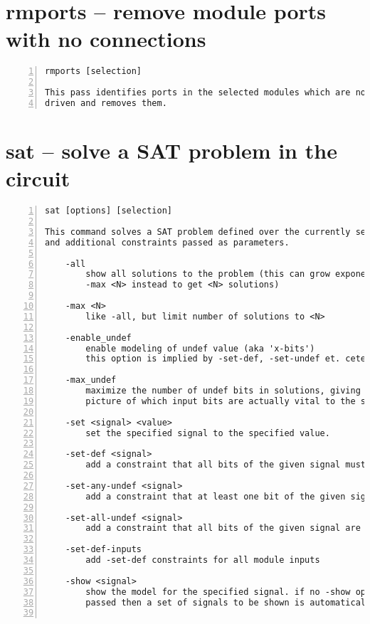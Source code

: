\section{rmports -- remove module ports with no connections}
\label{cmd:rmports}
\begin{lstlisting}[numbers=left,frame=single]
    rmports [selection]

This pass identifies ports in the selected modules which are not used or
driven and removes them.
\end{lstlisting}

\section{sat -- solve a SAT problem in the circuit}
\label{cmd:sat}
\begin{lstlisting}[numbers=left,frame=single]
    sat [options] [selection]

This command solves a SAT problem defined over the currently selected circuit
and additional constraints passed as parameters.

    -all
        show all solutions to the problem (this can grow exponentially, use
        -max <N> instead to get <N> solutions)

    -max <N>
        like -all, but limit number of solutions to <N>

    -enable_undef
        enable modeling of undef value (aka 'x-bits')
        this option is implied by -set-def, -set-undef et. cetera

    -max_undef
        maximize the number of undef bits in solutions, giving a better
        picture of which input bits are actually vital to the solution.

    -set <signal> <value>
        set the specified signal to the specified value.

    -set-def <signal>
        add a constraint that all bits of the given signal must be defined

    -set-any-undef <signal>
        add a constraint that at least one bit of the given signal is undefined

    -set-all-undef <signal>
        add a constraint that all bits of the given signal are undefined

    -set-def-inputs
        add -set-def constraints for all module inputs

    -show <signal>
        show the model for the specified signal. if no -show option is
        passed then a set of signals to be shown is automatically selected.


\end{lstlisting}

